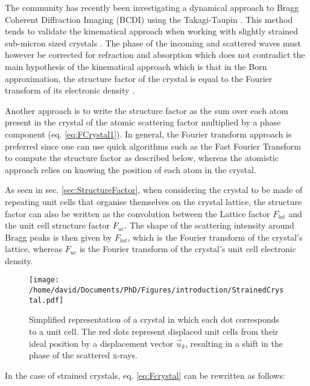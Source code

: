 The community has recently been investigating a dynamical approach to Bragg Coherent Diffraction Imaging (BCDI) \parencite{Yan2014, Shabalin2017, Hu2018, Gao2022} using the Takagi-Taupin \parencite{Takagi1962, Takagi1969}.
This method tends to validate the kinematical approach when working with slightly strained sub-micron sized crystals \parencite{Karpov2019, Barringer2021}.
The phase of the incoming and scattered waves must however be corrected for refraction and absorption \parencite{Harder2007, Gao2022} which does not contradict the main hypothesis of the kinematical approach which is that in the Born approximation, the structure factor of the crystal is equal to the Fourier transform of its electronic density \parencite{Paganin}.

Another approach is to write the structure factor as the sum over each atom present in the crystal of the atomic scattering factor multiplied by a phase component (eq. \ref{eq:FCrystal1}).
In general, the Fourier transform approach is preferred since one can use quick algorithms such as the Fast Fourier Transform \parencite{Cooley1965, Cochran1967} to compute the structure factor as described below, whereas the atomistic approach relies on knowing the position of each atom in the crystal.

As seen in sec. \ref{sec:StructureFactor}, when considering the crystal to be made of repeating unit cells that organise themselves on the crystal lattice, the structure factor can also be written as the convolution between the Lattice factor $F_{lat}$ and the unit cell structure factor $F_{uc}$.
The shape of the scattering intensity around Bragg peaks is then given by $F_{lat}$, which is the Fourier transform of the crystal's lattice, whereas $F_{uc}$ is the Fourier transform of the crystal's unit cell electronic density.

\begin{figure}[!htb]
    \centering
    \texttt{[image: /home/david/Documents/PhD/Figures/introduction/StrainedCrystal.pdf]}
    \caption{
    Simplified representation of a crystal in which each dot corresponds to a unit cell.
    The red dots represent displaced unit cells from their ideal position by a displacement vector $\vec{u}_k$, resulting in a shift in the phase of the scattered x-rays.
    }
    \label{fig:StrainedCrystals}
\end{figure}

In the case of strained crystals, eq. \ref{eq:Fcrystal} can be rewritten as follows:

